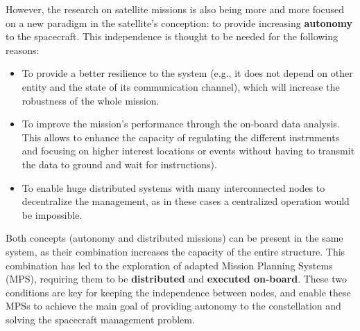 However, the research on satellite missions is also being more and more focused on a new paradigm in the satellite's conception: to provide increasing \textbf{autonomy} to the spacecraft.
This independence is thought to be needed for the following reasons:
\begin{itemize}
\item To provide a better resilience to the system (e.g., it does not depend on other entity and the state of its communication channel), which will increase the robustness of the whole mission.
\item To improve the mission's performance through the on-board data analysis. This allows to enhance the capacity of regulating the different instruments and focusing on higher interest locations or events without having to transmit the data to ground and wait for instructions).
\item To enable huge distributed systems with many interconnected nodes to decentralize the management, as in these cases a centralized operation would be impossible.
\end{itemize}

Both concepts (autonomy and distributed missions) can be present in the same system, as their combination increases the capacity of the entire structure. This combination has led to the exploration of adapted Mission Planning Systems (MPS), requiring them to be \textbf{distributed} and \textbf{executed on-board}. These two conditions are key for keeping the independence between nodes, and enable these MPSs to achieve the main goal of providing autonomy to the constellation and solving the spacecraft management problem.

